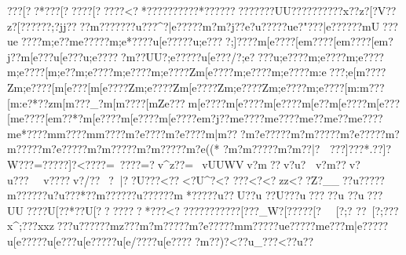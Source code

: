 {{{{{{{{{{{{{{{{{{{{{{{{{{{{{{{{{{{{{{{{{{{{{{{{{{{{{{{{{{{{{{{{{{{{{{{{{{{{{{{{{{{{{{{{{{{{{{{{{{{{{{{{{{{{{{{{{{{{{{{{{{{{{{{{{{{{{{{{{{{{{{{{{{{{{{{{{{{{{{{{{{{{{{{{{{{{{{{{{{{{{{{{{{{{{{{{{{{{{{{{{{{{{{{{{{{{{{{{{{{{{{{{{{{{{{{{{{{{{{{{{{{{{{{{{{{{{{{{{{{{{{{{{{{{{{{{{{{{{{{{{{{{{{{{{{{{{{{{{{{{{{{{{{{{{{{{{{{{{{{{{{{{{{{{{{{{{{{{{{{{{{{{{{{{{{{{{{{{{{{{{{{{{{{{{{{{{{{{{{{{{{{{{{{{{{{{{{{{{{{{{{{{{{{{{{{{{{{{{{{{{{{{{{{{{{{{{{{{{{{{{{{{{{{{{{{{{{{{{{{{{{{{{{{{{{{{{{{{{{{{{{{{{{{{{{{{{{{{{{{{{{{{{{{{{{{{{{{{{{{{{{{{{{{{{{{{{{{{{{{{{{{{{{{{{{{{{{{{{{{{{{{{{{{{{{{{{{{{{{{{{{{{{{{{{{{{{{{{{{{{{{{{{{{{{{{{{{{{{{{{{{{{{{{{{{{{{{{{{{{{{{{{{{{{{{{{{{{{{{{{{{{{{{{{{{{{{{{{{{{{{{{{{{{{{{{{{{{{{{{{{{{{{{{{{{{{{{{{{{{{{{{{{{{{{{{{{{{{{{{{{{{{{{{{{{{{{{{{{{{{{{{{{{{{{{{{{{{{{{{{{{{{{{{{{{{{{{{{{{{{{{{{{{{{{{{{{{{{{{{{{{{{{{{{{{{{{{{{{{{{{{{{{{{{{{{{{{{{{{{{{{{{{{{{{{{{{{{{{{{{{{{{{{{{{{{{{{{{{{{{{{{{{{{{{{{{{???[??*???[?? ???[??  ??{?<?*????\???????\?*?????{?  ???????UU???? ?????{?x??z{?[?V??z{?[?????{?;?jj????m???????u???^?}|e?????m?m?j??{e?u?????u{e?"???}|e?????}?mU???u{e????m;e??{m{e?????m;e*????u[e?????u;e????};]????{m[e????[e{m????[e{m????[e{m?j??{m[e???u[e???u;e?????{m??UU?};e?????u[e???/?};e????u;e????{m;e????{m;e????{m;e????[m;e??{m;e????{m;e????{m;e????Zm[e????{m;e????{m;e????{m:e???;e[m????Zm;e????[m[e???[m[e????Zm;e????Zm[e????Zm;e????Zm;e????{m;e????[m:m??? [m:e?*??zm[m???_?m[m????[mZe???{m[e????{m[e????{m[e????{m[e??{m[e????{m[e???[m{e????[e{m??*?{m[e????{m[e????{m[e????{e{m?j??{m{e????{m{e????{m{e??{m{e??{m{e????{m{e*????m{m????m{m????{m?e????{m?e????m|m?? ?m?e?????m?m?????m?e?????m?m?????m?e?????m?m?????m?m?????m?e((* ?m?m?????m?m??|?\?
???]???*.??]?W?  ??=?????]?<????\?=~????=?v^z??=~vUUWVv?m ??v?u? 
v?m??  v?u???~v????\?v?/??\?~? |??U???\?<?? \?<?U^?\?<?	???<?<?zz{<??Z?__??u?????m?}?????u?u???*?}?m?????}?u?????}?m*?????u??U?}?u
??U???u?????u
??u??} ?UU??} ??U[??}*??U[?????{??*??{?<? 
????{???????[???_W{?[? ???{?[?~[?;?
??~[?;???x^;???xxz???u?????}?mz???{m?m?????m?e?????m{m?????u{e?????m{e???{m|e?????u[e?????u[e???u[e?????u[e/????u[e?????{m??)?<??u_???<??u??
}}}}}}}}}}}}}}}}}}}}}}}}}}}}}}}}}}}}}}}}}}}}}}}}}}}}}}}}}}}}}}}}}}}}}}}}}}}}}}}}}}}}}}}}}}}}}}}}}}}}}}}}}}}}}}}}}}}}}}}}}}}}}}}}}}}}}}}}}}}}}}}}}}}}}}}}}}}}}}}}}}}}}}}}}}}}}}}}}}}}}}}}}}}}}}}}}}}}}}}}}}}}}}}}}}}}}}}}}}}}}}}}}}}}}}}}}}}}}}}}}}}}}}}}}}}}}}}}}}}}}}}}}}}}}}}}}}}}}}}}}}}}}}}}}}}}}}}}}}}}}}}}}}}}}}}}}}}}}}}}}}}}}}}}}}}}}}}}}}}}}}}}}}}}}}}}}}}}}}}}}}}}}}}}}}}}}}}}}}}}}}}}}}}}}}}}}}}}}}}}}}}}}}}}}}}}}}}}}}}}}}}}}}}}}}}}}}}}}}}}}}}}}}}}}}}}}}}}}}}}}}}}}}}}}}}}}}}}}}}}}}}}}}}}}}}}}}}}}}}}}}}}}}}}}}}}}}}}}}}}}}}}}}}}}}}}}}}}}}}}}}}}}}}}}}}}}}}}}}}}}}}}}}}}}}}}}}}}}}}}}}}}}}}}}}}}}}}}}}}}}}}}}}}}}}}}}}}}}}}}}}}}}}}}}}}}}}}}}}}}}}}}}}}}}}}}}}}}}}}}}}}}}}}}}}}}}}}}}}}}}}}}}}}}}}}}}}}}}}}}}}}}}}}}}}}}}}}}}}}}}}}}}}}}}}}}}}}}}}}}}}}}}}}}}}}}}}}}}}}}}}}}}}}}}}}}}}}}}}}}}}}}}}}}}}}}}}}}}}}}}}}}}}}}}}}}}}}}}}}}}}}}}}}}}}}}}}}}}}}}}}}}}}}}}}}}}}}}}}}}}}}}}}}}}}}}}}}}}}}}}}}}}}}}}}}}}}}}}}}}}}}}}}}}}}}}}}}}}}}}}}}}}}}}}}}}}}}}}}}}}}}}}}}}}}}}}}}}}}}}}}}}}}

